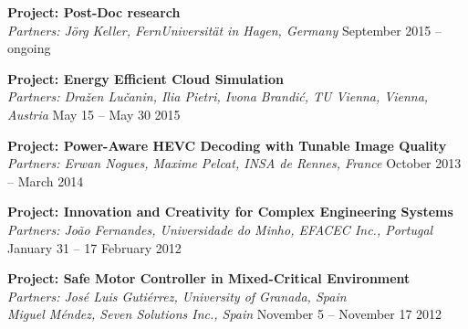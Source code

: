 \documentclass{article}
\begin{document}
\textbf{Project: Post-Doc research}\\
\textsl{Partners: J\"{o}rg Keller, FernUniversit\"{a}t in Hagen, Germany}
\hfill September 2015 -- ongoing

\textbf{Project: Energy Efficient Cloud Simulation}\\
\textsl{Partners: Dra\v{z}en Lu\v{c}anin, Ilia Pietri, Ivona Brandi\'{c}, TU Vienna, Vienna, Austria}
\hfill May 15 -- May 30 2015

\textbf{Project: Power-Aware HEVC Decoding with Tunable Image Quality}\\
\textsl{Partners: Erwan Nogues, Maxime Pelcat, INSA de Rennes, France}
\hfill October 2013 -- March 2014

\textbf{Project: Innovation and Creativity for Complex Engineering Systems}\\
\textsl{Partners: Jo\~{a}o Fernandes, Universidade do Minho, EFACEC Inc., Portugal}
\hfill January 31 -- 17 February 2012

\textbf{Project: Safe Motor Controller in Mixed-Critical Environment}\\
\textsl{Partners: Jos\'{e} Luis Guti\'{e}rrez, University of Granada, Spain \\ Miguel M\'{e}ndez, Seven Solutions Inc., Spain} 
\hfill November 5 -- November 17 2012


{\footnotesize
}

\end{document}
